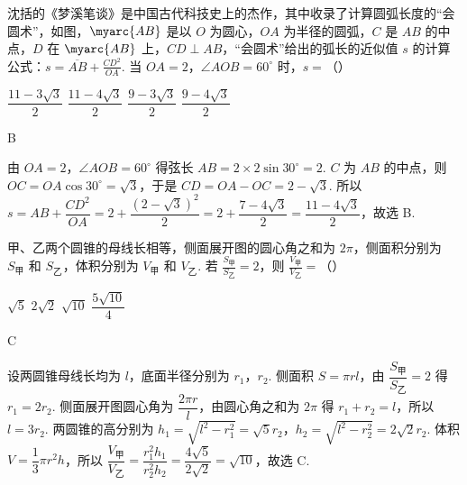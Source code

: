 \begin{problem}
沈括的《梦溪笔谈》是中国古代科技史上的杰作，其中收录了计算圆弧长度的“会圆术”，如图，\(\myarc{AB}\) 是以 \(O\) 为圆心，\(OA\) 为半径的圆弧，\(C\) 是 \(AB\) 的中点，\(D\) 在 \(\myarc{AB}\) 上，\(CD\perp AB\)，“会圆术”给出的弧长的近似值 \(s\) 的计算公式：\(s=\overline{AB}+\frac{CD^2}{OA}\). 当 \(OA=2\)，\(\angle AOB=60^\circ\) 时，\(s=\)（\quad）


\choices
    {\(\dfrac{11-3\sqrt3}{2}\)}
    {\(\dfrac{11-4\sqrt3}{2}\)}
    {\(\dfrac{9-3\sqrt3}{2}\)}
    {\(\dfrac{9-4\sqrt3}{2}\)}
\end{problem}

\begin{answer}
B
\end{answer}

\begin{solution}
由 \(OA=2\)，\(\angle AOB=60^\circ\) 得弦长 \(AB=2\times2\sin30^\circ=2\). \(C\) 为 \(AB\) 的中点，则 \(OC=OA\cos30^\circ=\sqrt3\)，于是 \(CD=OA-OC=2-\sqrt3\). 所以 \(s=AB+\dfrac{CD^2}{OA}=2+\dfrac{(2-\sqrt3)^2}{2}=2+\dfrac{7-4\sqrt3}{2}=\dfrac{11-4\sqrt3}{2}\)，故选 B.
\end{solution}

\begin{problem}
甲、乙两个圆锥的母线长相等，侧面展开图的圆心角之和为 \(2\pi\)，侧面积分别为 \(S_{\text{甲}}\) 和 \(S_{\text{乙}}\)，体积分别为 \(V_{\text{甲}}\) 和 \(V_{\text{乙}}\). 若 \(\frac{S_{\text{甲}}}{S_{\text{乙}}}=2\)，则 \(\frac{V_{\text{甲}}}{V_{\text{乙}}}=\)（\quad）

\choices
    {\(\sqrt5\)}
    {\(2\sqrt2\)}
    {\(\sqrt{10}\)}
    {\(\dfrac{5\sqrt{10}}{4}\)}
\end{problem}

\begin{answer}
C
\end{answer}

\begin{solution}
设两圆锥母线长均为 \(l\)，底面半径分别为 \(r_1\)，\(r_2\). 侧面积 \(S=\pi rl\)，由 \(\dfrac{S_{\text{甲}}}{S_{\text{乙}}}=2\) 得 \(r_1=2r_2\). 侧面展开图圆心角为 \(\dfrac{2\pi r}{l}\)，由圆心角之和为 \(2\pi\) 得 \(r_1+r_2=l\)，所以 \(l=3r_2\). 两圆锥的高分别为 \(h_1=\sqrt{l^2-r_1^2}=\sqrt5 r_2\)，\(h_2=\sqrt{l^2-r_2^2}=2\sqrt2 r_2\). 体积 \(V=\dfrac13\pi r^2h\)，所以 \(\dfrac{V_{\text{甲}}}{V_{\text{乙}}}=\dfrac{r_1^2h_1}{r_2^2h_2}=\dfrac{4\sqrt5}{2\sqrt2}=\sqrt{10}\)，故选 C.
\end{solution}

